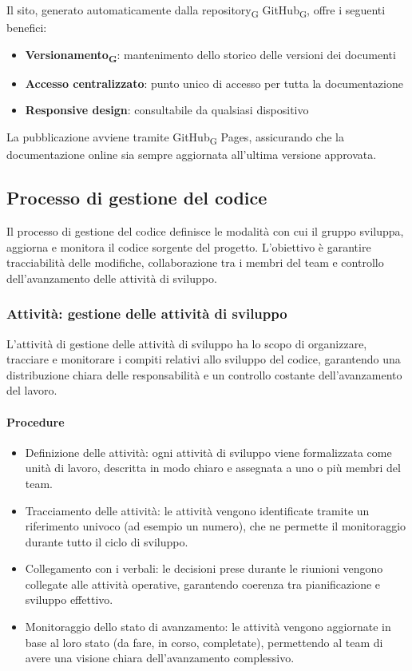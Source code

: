 \documentclass[11pt,a4paper]{article}
\newcommand{\gls}[1]{#1\textsubscript{G}}
\begin{document}
Il sito, generato automaticamente dalla \gls{repository} \gls{GitHub}, offre i seguenti benefici:
\begin{itemize}
    \item \textbf{\gls{Versionamento}}: mantenimento dello storico delle versioni dei documenti
    \item \textbf{Accesso centralizzato}: punto unico di accesso per tutta la documentazione
    \item \textbf{Responsive design}: consultabile da qualsiasi dispositivo
\end{itemize}

La pubblicazione avviene tramite \gls{GitHub} Pages, assicurando che la documentazione online sia sempre aggiornata all'ultima versione approvata.


\subsection{Processo di gestione del codice}
Il processo di gestione del codice definisce le modalità con cui il gruppo sviluppa, aggiorna e monitora il codice sorgente del progetto.
L’obiettivo è garantire tracciabilità delle modifiche, collaborazione tra i membri del team e controllo dell’avanzamento delle attività di sviluppo.

\subsubsection{Attività: gestione delle attività di sviluppo}
L’attività di gestione delle attività di sviluppo ha lo scopo di organizzare, tracciare e monitorare i compiti relativi allo sviluppo del codice, garantendo una distribuzione chiara delle responsabilità e un controllo costante dell’avanzamento del lavoro.

\paragraph{Procedure}
\begin{itemize}
    \item Definizione delle attività: ogni attività di sviluppo viene formalizzata come unità di lavoro, descritta in modo chiaro e assegnata a uno o più membri del team.
    \item Tracciamento delle attività: le attività vengono identificate tramite un riferimento univoco (ad esempio un numero), che ne permette il monitoraggio durante tutto il ciclo di sviluppo.
    \item Collegamento con i verbali: le decisioni prese durante le riunioni vengono collegate alle attività operative, garantendo coerenza tra pianificazione e sviluppo effettivo.
    \item Monitoraggio dello stato di avanzamento: le attività vengono aggiornate in base al loro stato (da fare, in corso, completate), permettendo al team di avere una visione chiara dell’avanzamento complessivo.
\end{itemize}
\end{document}
